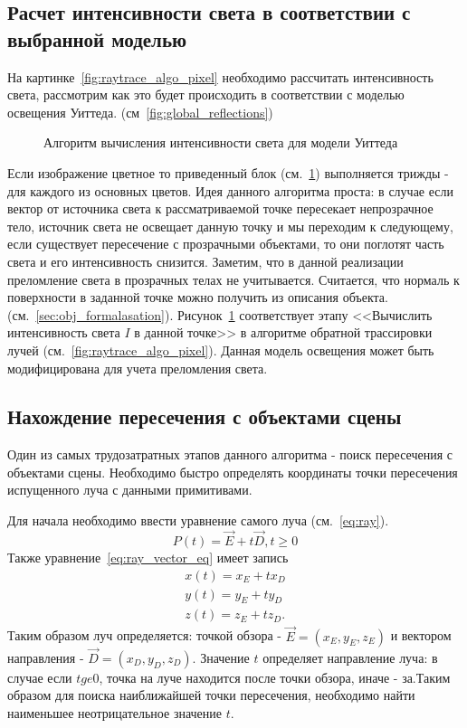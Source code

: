 \documentclass[a4paper,14pt,unknownkeysallowed]{extreport}
\begin{document}
\subsection{Расчет интенсивности света в соответствии с выбранной моделью}
На картинке~\ref{fig:raytrace_algo_pixel} необходимо рассчитать интенсивность света, рассмотрим как это будет происходить в соответствии с моделью освещения Уиттеда. (см~\ref{fig:global_reflections})
\begin{figure}[h]
	\centering
	
	\caption{Алгоритм вычисления интенсивности света для модели Уиттеда}
	\label{fig:yuitted_model_algo}
\end{figure}
Если изображение цветное то приведенный блок (см.~\ref{fig:yuitted_model_algo}) выполняется трижды - для каждого из основных цветов. Идея данного алгоритма проста:
в случае если вектор от источника света к рассматриваемой точке пересекает непрозрачное тело, источник света не освещает данную точку и мы переходим к следующему,
если существует пересечение с прозрачными объектами, то они поглотят часть света и его интенсивность снизится. Заметим, что в данной реализации преломление света в прозрачных телах не учитывается.
Считается, что нормаль к поверхности в заданной точке можно получить из описания объекта. (см.~\ref{sec:obj_formalasation}).
Рисунок~\ref{fig:yuitted_model_algo} соответствует этапу <<Вычислить интенсивность света \(I\) в данной точке>> в алгоритме обратной трассировки лучей (см.~\ref{fig:raytrace_algo_pixel}).
Данная модель освещения может быть модифицирована для учета преломления света. \cite{Rodgers}

\subsection{Нахождение пересечения с объектами сцены}
Один из самых трудозатратных этапов данного алгоритма  - поиск пересечения с объектами сцены. Необходимо быстро определять координаты точки пересечения испущенного луча 
с данными примитивами.


Для начала необходимо ввести уравнение самого луча (см.~\ref{eq:ray}).
\begin{equation} 
	P(t) = \vec{E} +t\vec{D},t \ge 0
	\label{eq:ray_vector_eq}
\end{equation}
Также уравнение~\ref{eq:ray_vector_eq} имеет запись
\begin{equation}
	\label{eq:ray_scalar_eq}
	\begin{aligned}
		x(t) = x_E + t x_D \\
		y(t) = y_E + t y_D \\
		z(t) = z_E + t z_D.
	\end{aligned}
\end{equation}
Таким образом луч определяется: точкой обзора - $\vec{E} = (x_E,y_E,z_E)$ и вектором направления - $\vec{D} = (x_D,y_D,z_D)$. Значение $t$  определяет направление луча: в случае если $t ge 0$,
точка на луче находится после точки обзора, иначе - за.Таким образом для поиска наиближайшей точки пересечения, необходимо найти наименьшее неотрицательное значение $t$.\cite{Rodgers,primitives_raytracing_equations} 
\end{document}
